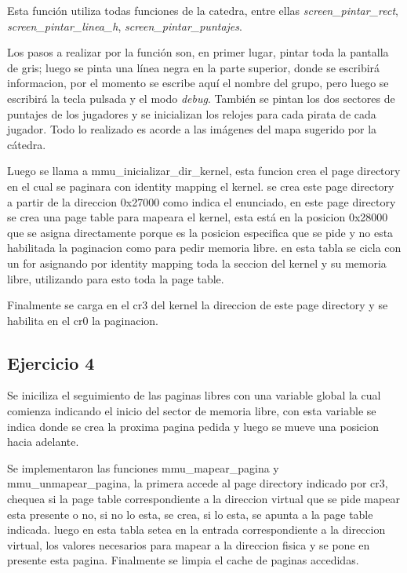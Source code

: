 Esta función utiliza todas funciones de la catedra, entre ellas
{\it screen_pintar_rect\/}, {\it screen_pintar_linea_h\/},
{\it screen_pintar_puntajes\/}.

Los pasos a realizar por la función son, en primer lugar, pintar toda la
pantalla de gris; luego se pinta una línea negra en la parte superior, donde se
escribirá informacion, por el momento se escribe aquí el nombre del grupo, pero
luego se escribirá la tecla pulsada y el modo {\it debug\/}.
También se pintan los dos sectores de puntajes de los jugadores y se inicializan
los relojes para cada pirata de cada jugador. Todo lo realizado es acorde a las
imágenes del mapa sugerido por la cátedra.

Luego se llama a mmu_inicializar_dir_kernel, esta funcion crea el page directory en el cual se paginara
con identity mapping el kernel. se crea este page directory a partir de la direccion 0x27000 como indica el enunciado,
en este page directory se crea una page table para mapeara el kernel, esta está en la posicion 0x28000 que
se asigna directamente porque es la posicion especifica que se pide y no esta habilitada la paginacion como
para pedir memoria libre. en esta tabla se cicla con un for asignando por identity mapping toda la
seccion del kernel y su memoria libre, utilizando para esto toda la page table.

Finalmente se carga en el cr3 del kernel la direccion de este page directory y se habilita en el cr0 la paginacion.


\subsection{Ejercicio 4}

Se iniciliza el seguimiento de las paginas libres con una variable global la cual comienza indicando el inicio
del sector de memoria libre, con esta variable se indica donde se crea la proxima pagina pedida y luego se mueve
una posicion hacia adelante.

Se implementaron las funciones mmu_mapear_pagina y mmu_unmapear_pagina, la primera accede al page directory
indicado por cr3, chequea si la page table correspondiente a la direccion virtual que se pide mapear esta presente o no,
si no lo esta, se crea, si lo esta, se apunta a la page table indicada. luego en esta tabla setea en la entrada correspondiente
a la direccion virtual, los valores necesarios para mapear a la direccion fisica y se pone en presente esta pagina.
Finalmente se limpia el cache de paginas accedidas.

